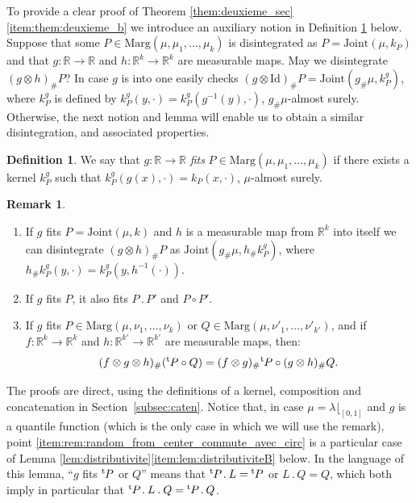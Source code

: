 \documentclass[JEP,XML,SOM,Unicode,NoEqCountersInSection,NoFloatCountersInSection,published]{cedram}
\newcommand{\ldot}{\mathbin{.}}
\theoremstyle{plain}
\theoremstyle{definition}
\newtheorem{defi}[them]{Definition}
\newtheorem{rem}[them]{Remark}
\newcommand{\id}{\mathrm{Id}}
\newcommand{\join}{\mathrm{Joint}}
\newcommand{\trans}{{}^{\mathrm{t}}\mkern-1mu}
\newcommand{\la}{\lambda}
\newcommand{\ma}{\mathrm{Marg}}
\newcommand{\R}{\mathbb{R}}
\begin{document}
To provide a clear proof of Theorem \ref{them:deuxieme_sec}\eqref{item:them:deuxieme_b} we introduce an auxiliary notion in Definition \ref{defi:fits} below.
Suppose that some $P\in \ma(\mu,\mu_1,\ldots,\mu_k)$ is disintegrated as $P=\join(\mu,k_{P})$ and that $g:\R\to \R$ and $h:\R^k\to \R^k$ are measurable maps. May we disintegrate $(g\otimes h)_\#P$? In case $g$ is into one easily checks $(g\otimes \id)_\#P=\join(g_\#\mu,k^g_P)$, where $k^g_P$ is defined by $k^g_P(y,\cdot)= k^g_P(g^{-1}(y),\cdot)$, $g_\#\mu$-almost surely. Otherwise, the next notion and lemma will enable us to obtain a similar disintegration, and associated properties.

\begin{defi}\label{defi:fits}
We say that $g:\R\to \R$ \emph{fits} $P\in \ma(\mu,\mu_1,\ldots,\mu_k)$ if there exists a kernel $k^g_P$ such that $k^g_P(g(x),\cdot)=k_{P}(x,\cdot)$, $\mu$-almost surely.
\end{defi}

\skpt
\begin{rem}\label{rem:random_from_center}\begin{enumerate}
\item
\label{item:rem:random_from_center_a} If $g$ fits $P=\join(\mu,k)$ and $h$ is a measurable map from $\R^k$ into itself we can disintegrate $(g\otimes h)_\#P$ as $\join(g_\#\mu,h_\#k^g_P)$, where $h_\#k^g_P(y,\cdot)= k^g_P(y,h^{-1}(\cdot))$.

\item
\label{item:rallonge} If $g$ fits $P$, it also fits $P\ldot P'$ and $P\circ P'$.

\item
\label{item:rem:random_from_center_commute_avec_circ} If $g$ fits $P\in \ma(\mu,\nu_1,\ldots,\nu_k)$ or $Q\in\ma(\mu,\nu'_1,\ldots,\nu'_{k'})$, and if $f:\R^k\to\R^k$ and $h:\R^{k'}\to\R^{k'}$ are measurable maps, then:
\[(f\otimes g \otimes h)_\#(\trans P\circ Q)=(f\otimes g)_\#\trans P\circ (g \otimes h)_\#Q.\]
\end{enumerate}

The proofs are direct, using the definitions of a kernel, composition and concatenation in Section~\ref{subsec:caten}. Notice that, in case $\mu=\la\lfloor_{[0,1]}$ and $g$ is a quantile function (which is the only case in which we will use the remark), point \eqref{item:rem:random_from_center_commute_avec_circ} is a particular case of Lemma \ref{lem:distributivite}\eqref{item:lem:distributiviteB} below. In the language of this lemma, ``$g$ fits $\trans P$ or $Q$'' means that $\trans P\ldot L=\trans P$ or $L\ldot Q=Q$, which both imply in particular that $\trans P\ldot L\ldot Q=\trans P\ldot Q$.
\end{rem}
\end{document}
